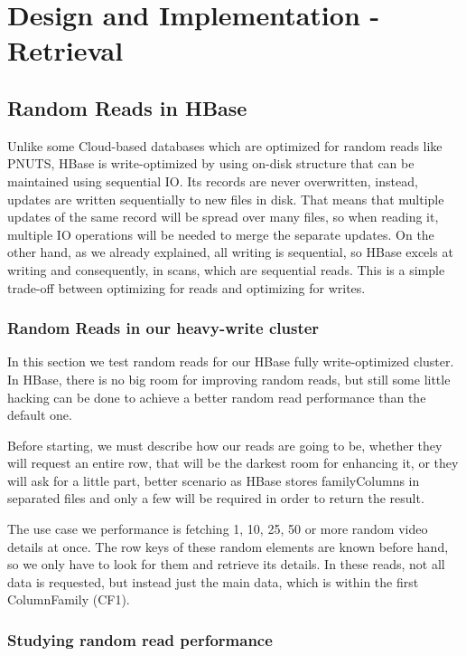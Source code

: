 \chapter{Design and Implementation - Retrieval}
\label{chapter:Design and Implementation - Retrieval}

\section{Random Reads in HBase}

Unlike some Cloud-based databases which are optimized for random reads like PNUTS, HBase is write-optimized by using on-disk structure that can be maintained using sequential IO. Its records are never overwritten, instead, updates are written sequentially to new files in disk. That means that multiple updates of the same record will be spread over many files, so when reading it, multiple IO operations will be needed to merge the separate updates. On the other hand, as we already explained, all writing is sequential, so HBase excels at writing and consequently, in scans, which are sequential reads. This is a simple trade-off between optimizing for reads and optimizing for writes.

\subsection{Random Reads in our heavy-write cluster}

In this section we test random reads for our HBase fully write-optimized cluster. In HBase, there is no big room for improving random reads, but still some little hacking can be done to achieve a better random read performance than the default one.
\par
Before starting, we must describe how our reads are going to be, whether they will request an entire row, that will be the darkest room for enhancing it, or they will ask for a little part, better scenario as HBase stores familyColumns in separated files and only a few will be required in order to return the result. 
\par
The use case we performance is fetching 1, 10, 25, 50 or more random video details at once. The row keys of these random elements are known before hand, so we only have to look for them and retrieve its details. In these reads, not all data is requested, but instead just the main data, which is within the first ColumnFamily (CF1).                  

\subsection{Studying random read performance}

